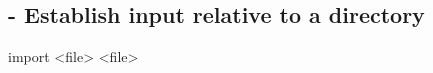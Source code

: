 
\subsection{ - Establish input relative to a directory}

\begin{demo}{}{import}
	{<file>}
	{<file>}
\end{demo}
